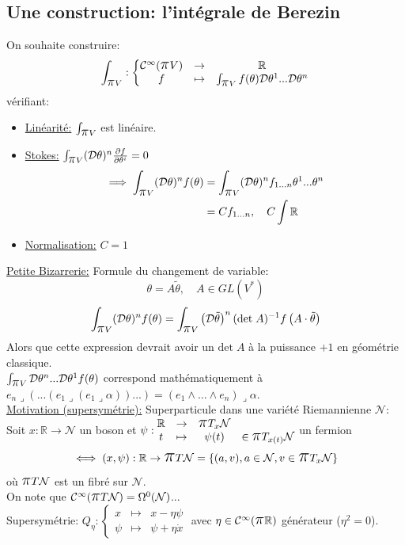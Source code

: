 \documentclass[a4paper,11pt]{article}
\newcommand{\D}{{\mathcal{D}}}
\newcommand{\dr}[2]{\frac{\partial {#1}}{\partial{#2}}}
\newcommand{\ppi}{{\mathlarger{\mathlarger{\mathlarger{\pi}}}}}
\begin{document}
\subsection{Une construction: l'intégrale de Berezin}
On souhaite construire:
$$\int_{\ppi V} : \left\{\begin{matrix}
\mathcal{C}^\infty(\ppi V) & \to & \mathbb{R}\\
f & \mapsto & \int_{\ppi V} f(\theta) \D \theta^1 ... \D\theta^n
\end{matrix}\right.$$
vérifiant:
\begin{itemize}
\item \underline{Linéarité:} $\int_{\ppi V}$ est linéaire.
\item \underline{Stokes:} $\int_{\ppi V} (\D\theta)^n \dr f {\theta^i} = 0$
\begin{align*}
\implies \int_{\ppi V} (\D \theta)^n f(\theta) &= \int_{\ppi V} (\D\theta)^n f_{1...n} \theta^1...\theta^n\\
&= C f_{1...n}, \quad C\int \mathbb{R}
\end{align*}
\item \underline{Normalisation:} $C=1$
\end{itemize}

\noindent \underline{Petite Bizarrerie:} Formule du changement de variable:
$$\theta = A \tilde \theta, \quad A \in GL(V^*)$$
$$\int_{\ppi V} (\D\theta)^nf(\theta) = \int_{\ppi V} \left(\D\tilde \theta\right)^n (\mathrm{det}\;A)^{-1} f\left(A\cdot\tilde\theta\right)$$
Alors que cette expression devrait avoir un $\mathrm{det}\;A$ à la puissance $+1$ en géométrie classique.\\
$\int_{\ppi V} \D \theta^n...\D\theta^1 f(\theta)$ correspond mathématiquement à $e_n \lrcorner(...(e_1\lrcorner(e_1\lrcorner \alpha))...) = (e_1 \wedge ... \wedge e_n)\lrcorner \alpha.$\\

\noindent \underline{Motivation (supersymétrie):} Superparticule dans une variété Riemannienne $\mathcal{N}$: 
\\
Soit $x:\mathbb{R}\to \mathcal{N}$ un boson et $\psi:\begin{matrix}\mathbb{R}&\to&\ppi T_x\mathcal{N}&\\t&\mapsto&\psi(t)&\in\ppi T_{x(t)}\mathcal{N}\end{matrix}$ un fermion
$$\iff (x,\psi): \mathbb{R} \to \ppi T\mathcal{N}=\left\{(a,v), a\in \mathcal{N}, v\in \ppi T_x\mathcal{N}\right\}$$
où $\ppi T\mathcal{N}$ est un fibré sur $\mathcal{N}$.\\
On note que $\mathcal{C}^\infty(\ppi T\mathcal{N})=\Omega^0(\mathcal{N})$...\\
Supersymétrie: $Q_\eta :
\left\{
\begin{matrix}
x    & \mapsto & x-\eta\psi\\
\psi & \mapsto & \psi+\eta\dot x
\end{matrix}
\right.
$ \quad avec $\eta \in \mathcal{C}^\infty(\ppi\mathbb{R})$ générateur ($\eta^2=0$).\\
\end{document}
